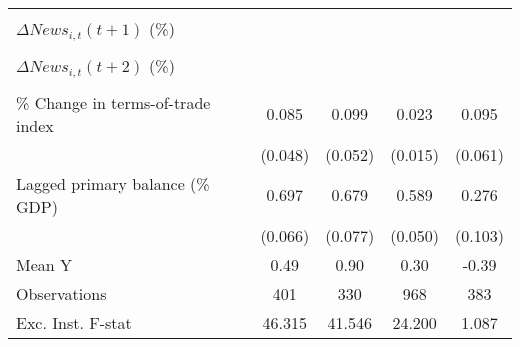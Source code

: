 {\begin{tabular}{l*{4}{c}}
                    &                     &                     &                     &                     \\
\addlinespace
$ \Delta News_{i,t}(t+1)$ (\%)&                     &                     &                     &                     \\
                    &                     &                     &                     &                     \\
\addlinespace
$ \Delta News_{i,t}(t+2)$ (\%)&                     &                     &                     &                     \\
                    &                     &                     &                     &                     \\
\addlinespace
\% Change in terms-of-trade index&       0.085\sym{*}  &       0.099\sym{*}  &       0.023         &       0.095         \\
                    &     (0.048)         &     (0.052)         &     (0.015)         &     (0.061)         \\
\addlinespace
Lagged primary balance (\% GDP)&       0.697\sym{***}&       0.679\sym{***}&       0.589\sym{***}&       0.276\sym{***}\\
                    &     (0.066)         &     (0.077)         &     (0.050)         &     (0.103)         \\
\midrule
Mean Y              &        0.49         &        0.90         &        0.30         &       -0.39         \\
Observations        &         401         &         330         &         968         &         383         \\
Exc. Inst. F-stat   &      46.315         &      41.546         &      24.200         &       1.087         \\
\bottomrule
\end{tabular}
}

